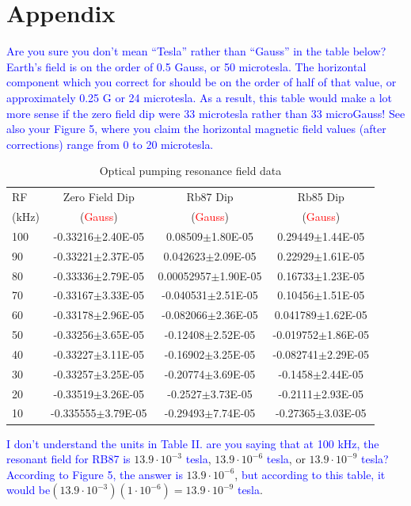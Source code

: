\documentclass[prb,preprint]{revtex4-1}
\begin{document}
\section{Appendix}
\textcolor{blue}{Are you sure you don't mean ``Tesla'' rather than ``Gauss'' in the table below?  Earth's field is on the order of 0.5 Gauss, or 50 microtesla. The horizontal component which you correct for should be on the order of half of that value, or approximately 0.25 G or 24 microtesla. As a result, this table would make a lot more sense if the zero field dip were 33 microtesla rather than 33 microGauss! See also your Figure 5, where you claim the horizontal magnetic field values (after corrections) range from 0 to 20 microtesla. }  
\begin{table}[h]
\centering
\caption{Optical pumping resonance field data}
\begin{ruledtabular}
\begin{tabular}{ l c c c}
RF & Zero Field Dip & Rb87 Dip & Rb85 Dip\\
(kHz) & (\textcolor{red}{Gauss}) & (\textcolor{red}{Gauss}) & (\textcolor{red}{Gauss})\\
\hline
100	& -0.33216$\pm$2.40E-05 & 0.08509$\pm$1.80E-05 & 0.29449$\pm$1.44E-05\\
90&-0.33221$\pm$2.37E-05&0.042623$\pm$2.09E-05&0.22929$\pm$1.61E-05\\
80&-0.33336$\pm$2.79E-05&0.00052957$\pm$1.90E-05&0.16733$\pm$1.23E-05\\
70&-0.33167$\pm$3.33E-05&-0.040531$\pm$2.51E-05&0.10456$\pm$1.51E-05\\
60&-0.33178$\pm$2.96E-05&-0.082066$\pm$2.36E-05&0.041789$\pm$1.62E-05\\
50&-0.33256$\pm$3.65E-05&-0.12408$\pm$2.52E-05&-0.019752$\pm$1.86E-05\\
40&-0.33227$\pm$3.11E-05&-0.16902$\pm$3.25E-05&-0.082741$\pm$2.29E-05\\
30&-0.33257$\pm$3.25E-05&-0.20774$\pm$3.69E-05&-0.1458$\pm$2.44E-05	\\
20&-0.33519$\pm$3.26E-05&-0.2527$\pm$3.73E-05&-0.2111$\pm$2.93E-05\\
10	&-0.335555$\pm$3.79E-05&-0.29493$\pm$7.74E-05&-0.27365$\pm$3.03E-05\\
\end{tabular}
\end{ruledtabular}
\label{data}
\end{table}

\textcolor{blue}{I don't understand the units in Table II. are you saying that at 100 kHz, the resonant field for RB87 is }$13.9 \cdot 10^{-3}$ \textcolor{blue}{tesla}, $13.9 \cdot 10^{-6}$ \textcolor{blue}{tesla}, or $13.9 \cdot 10^{-9}$ \textcolor{blue}{tesla? According to Figure 5, the answer is } $13.9 \cdot 10^{-6}$, \textcolor{blue}{but according to this table, it would be}$(13.9 \cdot10^{-3})(1 \cdot10^{-6}) =  13.9 \cdot10^{-9}$   \textcolor{blue}{tesla}.   
\vspace*{-5cm}
\end{document}
